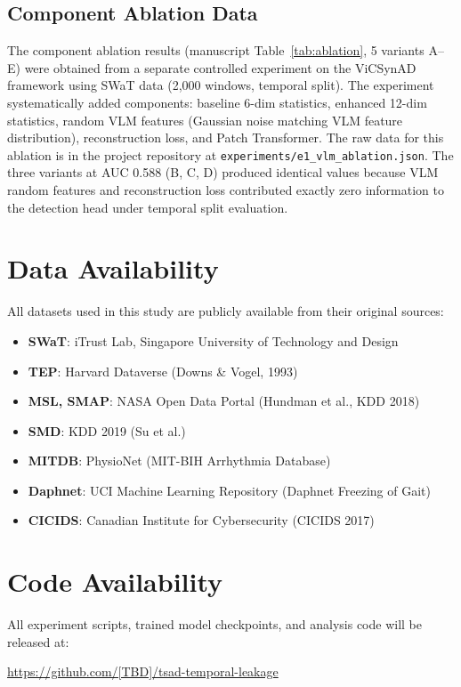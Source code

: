\documentclass[12pt]{article}
\begin{document}
\subsection{Component Ablation Data}
The component ablation results (manuscript Table~\ref{tab:ablation}, 5 variants A--E) were obtained from a separate controlled experiment on the ViCSynAD framework using SWaT data (2,000 windows, temporal split). The experiment systematically added components: baseline 6-dim statistics, enhanced 12-dim statistics, random VLM features (Gaussian noise matching VLM feature distribution), reconstruction loss, and Patch Transformer. The raw data for this ablation is in the project repository at \texttt{experiments/e1\_vlm\_ablation.json}. The three variants at AUC 0.588 (B, C, D) produced identical values because VLM random features and reconstruction loss contributed exactly zero information to the detection head under temporal split evaluation.

\section{Data Availability}

All datasets used in this study are publicly available from their original sources:
\begin{itemize}
    \item \textbf{SWaT}: iTrust Lab, Singapore University of Technology and Design
    \item \textbf{TEP}: Harvard Dataverse (Downs \& Vogel, 1993)
    \item \textbf{MSL, SMAP}: NASA Open Data Portal (Hundman et al., KDD 2018)
    \item \textbf{SMD}: KDD 2019 (Su et al.)
    \item \textbf{MITDB}: PhysioNet (MIT-BIH Arrhythmia Database)
    \item \textbf{Daphnet}: UCI Machine Learning Repository (Daphnet Freezing of Gait)
    \item \textbf{CICIDS}: Canadian Institute for Cybersecurity (CICIDS 2017)
\end{itemize}

\section{Code Availability}

All experiment scripts, trained model checkpoints, and analysis code will be released at:
\begin{center}
\url{https://github.com/[TBD]/tsad-temporal-leakage}
\end{center}
\end{document}
